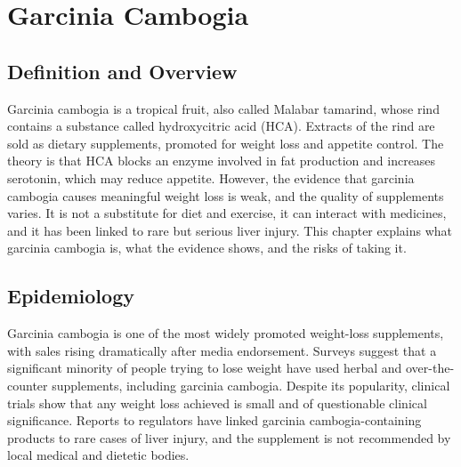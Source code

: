 \chapter{Garcinia Cambogia}

\section*{Definition and Overview}
Garcinia cambogia is a tropical fruit, also called Malabar tamarind, whose rind contains a substance called hydroxycitric acid (HCA). Extracts of the rind are sold as dietary supplements, promoted for weight loss and appetite control. The theory is that HCA blocks an enzyme involved in fat production and increases serotonin, which may reduce appetite. However, the evidence that garcinia cambogia causes meaningful weight loss is weak, and the quality of supplements varies. It is not a substitute for diet and exercise, it can interact with medicines, and it has been linked to rare but serious liver injury. This chapter explains what garcinia cambogia is, what the evidence shows, and the risks of taking it.

\section*{Epidemiology}
Garcinia cambogia is one of the most widely promoted weight-loss supplements, with sales rising dramatically after media endorsement. Surveys suggest that a significant minority of people trying to lose weight have used herbal and over-the-counter supplements, including garcinia cambogia. Despite its popularity, clinical trials show that any weight loss achieved is small and of questionable clinical significance. Reports to regulators have linked garcinia cambogia-containing products to rare cases of liver injury, and the supplement is not recommended by local medical and dietetic bodies.

